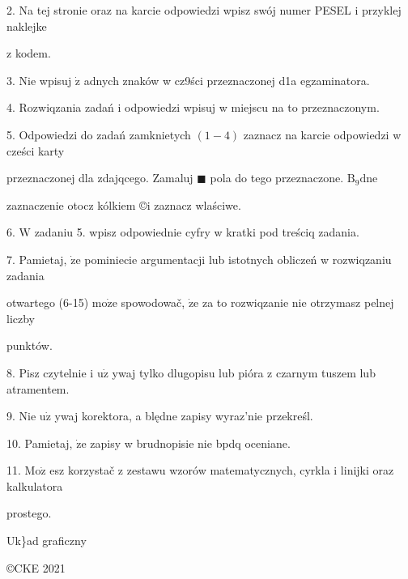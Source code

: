 \documentclass[a4paper,12pt]{article}
\begin{document}
2. Na tej stronie oraz na karcie odpowiedzi wpisz swój numer PESEL i przyklej naklejke

z kodem.

3. Nie wpisuj $\dot{\mathrm{z}}$ adnych znaków w cz9ści przeznaczonej d1a egzaminatora.

4. Rozwiqzania zadań i odpowiedzi wpisuj w miejscu na to przeznaczonym.

5. Odpowiedzi do zadań zamknietych $(1-4)$ zaznacz na karcie odpowiedzi w cześci karty

przeznaczonej dla zdajqcego. Zamaluj $\blacksquare$ pola do tego przeznaczone. $\mathrm{B}_{9}\mathrm{d}\mathrm{n}\mathrm{e}$

zaznaczenie otocz kólkiem \copyright i zaznacz wlaściwe.

6. $\mathrm{W}$ zadaniu 5. wpisz odpowiednie cyfry w kratki pod treściq zadania.

7. Pamietaj, $\dot{\mathrm{z}}\mathrm{e}$ pominiecie argumentacji lub istotnych obliczeń w rozwiqzaniu zadania

otwartego (6-15) $\mathrm{m}\mathrm{o}\dot{\mathrm{z}}\mathrm{e}$ spowodowač, $\dot{\mathrm{z}}\mathrm{e}$ za to rozwiqzanie nie otrzymasz pelnej liczby

punktów.

8. Pisz czytelnie i $\mathrm{u}\dot{\mathrm{z}}$ ywaj tylko dlugopisu lub pióra z czarnym tuszem lub atramentem.

9. Nie $\mathrm{u}\dot{\mathrm{z}}$ ywaj korektora, a blędne zapisy wyraz'nie przekreśl.

10. Pamietaj, $\dot{\mathrm{z}}\mathrm{e}$ zapisy w brudnopisie nie bpdq oceniane.

11. $\mathrm{M}\mathrm{o}\dot{\mathrm{z}}$ esz korzystač z zestawu wzorów matematycznych, cyrkla i linijki oraz kalkulatora

prostego.

Uk\}ad graficzny

\copyright CKE 2021
\end{document}
